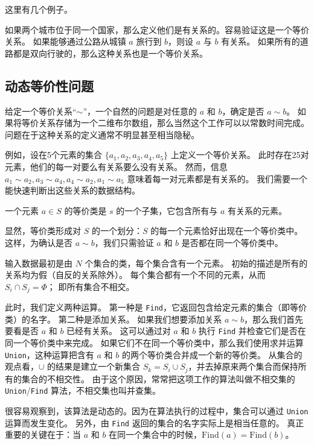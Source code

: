 \documentclass[withoutpreface,bwprint]{cumcmthesis}
\begin{document}
这里有几个例子。

如果两个城市位于同一个国家，那么定义他们是有关系的。容易验证这是一个等价关系。
如果能够通过公路从城镇 $a$ 旅行到 $b$，则设 $a$ 与 $b$ 有关系。
如果所有的道路都是双向行驶的，那么这种关系也是一个等价关系。

\subsection{动态等价性问题}

给定一个等价关系“$\sim$”，一个自然的问题是对任意的 $a$ 和 $b$，确定是否 $a\sim{}b$。
如果将等价关系存储为一个二维布尔数组，那么当然这个工作可以以常数时间完成。
问题在于这种关系的定义通常不明显甚至相当隐秘。

例如，设在5个元素的集合 $\{a_1,a_2,a_3,a_4,a_5\}$ 上定义一个等价关系。
此时存在25对元素，他们的每一对要么有关系要么没有关系。
然而，信息 $a_1\sim{}a_2, a_3\sim{}a_4, a_4\sim{}a_2, a_1\sim{}a_5$ 意味着每一对元素都是有关系的。
我们需要一个能快速判断出这些关系的数据结构。

\begin{definition}[等价类]
一个元素 $a\in{}S$ 的等价类是 $s$ 的一个子集，它包含所有与 $a$ 有关系的元素。
\end{definition}

显然，等价类形成对 $S$ 的一个划分：$S$ 的每一个元素恰好出现在一个等价类中。
这样，为确认是否 $a\sim{}b$，我们只需验证 $a$ 和 $b$ 是否都在同一个等价类中。

输入数据最初是由 $N$ 个集合的类，每个集合含有一个元素。
初始的描述是所有的关系均为假（自反的关系除外）。
每个集合都有一个不同的元素，从而 $S_i\cap{}S_j = \varPhi$；
即所有集合不相交。

此时，我们定义两种运算。
第一种是 \verb|Find|，它返回包含给定元素的集合（即等价类）的名字。
第二种是添加关系。
如果我们想要添加关系 $a\sim{}b$，那么我们首先要看是否 $a$ 和 $b$ 已经有关系。
这可以通过对 $a$ 和 $b$ 执行 \verb|Find| 并检查它们是否在同一个等价类中来完成。
如果它们不在同一个等价类中，那么我们使用求并运算 \verb|Union|，这种运算把含有 $a$ 和 $b$ 的两个等价类合并成一个新的等价类。
从集合的观点看，$\cup$ 的结果是建立一个新集合 $S_k = S_i \cup S_j$，并去掉原来两个集合而保持所有的集合的不相交性。
由于这个原因，常常把这项工作的算法叫做不相交集的 \verb|Union|/\verb|Find| 算法，不相交集也叫并查集。

很容易观察到，该算法是动态的。因为在算法执行的过程中，集合可以通过 \verb|Union| 运算而发生变化。
另外，由 \verb|Find| 返回的集合的名字实际上是相当任意的。
真正重要的关键在于：当 $a$ 和 $b$ 在同一个集合中的时候，$\mathrm{Find}(a) = \mathrm{Find}(b)$。
\end{document}
